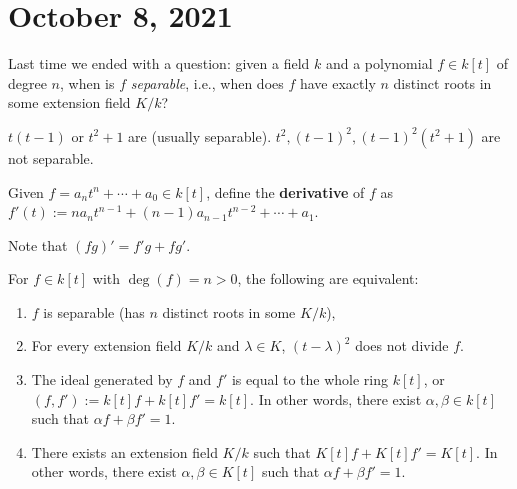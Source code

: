 \section{October 8, 2021} 
Last time we ended with a question: given a field $k$ and a polynomial $f \in k[t]$ of degree $n$, when is $f$ \emph{separable}, i.e., when does $f$ have exactly $n$ distinct roots in some extension field $K /k$?
\begin{example}
    $t(t-1)$ or $t^2+1$ are (usually separable). $t^2,(t-1)^2, (t-1)^2(t^2+1)$ are not separable.
\end{example}
\begin{definition}[]
    Given $f=a _n  t ^n  + \cdots +a_0 \in k[t]$, define the \textbf{derivative} of $f$ as $f'(t):= n a _n  t ^{n-1}+(n-1) a _{n-1}t ^{n-2}+ \cdots + a_1$.
\end{definition}
Note that $(fg)'=f'g+fg'$.
\begin{prop}
    For $f \in k[t]$ with $\deg (f)=n>0$, the following are equivalent:
    \begin{enumerate}[label=(\arabic*)]
    \setlength\itemsep{-.2em}
        \item $f$ is separable (has $n$ distinct roots in some $K /k$),
        \item For every extension field $K/ k$ and $\lambda \in K$, $(t-\lambda)^2$ does not divide $f$.
        \item The ideal generated by $f$ and $f'$ is equal to the whole ring $k[t]$, or $(f,f'):=k[t]f+k[t]f'=k[t]$. In other words, there exist $\alpha ,\beta  \in k[t]$ such that $\alpha f+\beta  f'=1$.
        \item There exists an extension field $K /k$ such that $K[t]f+K[t]f'=K[t]$. In other words, there exist $\alpha ,\beta  \in K[t]$ such that $\alpha  f + \beta  f'=1$.
    \end{enumerate}
\end{prop}
